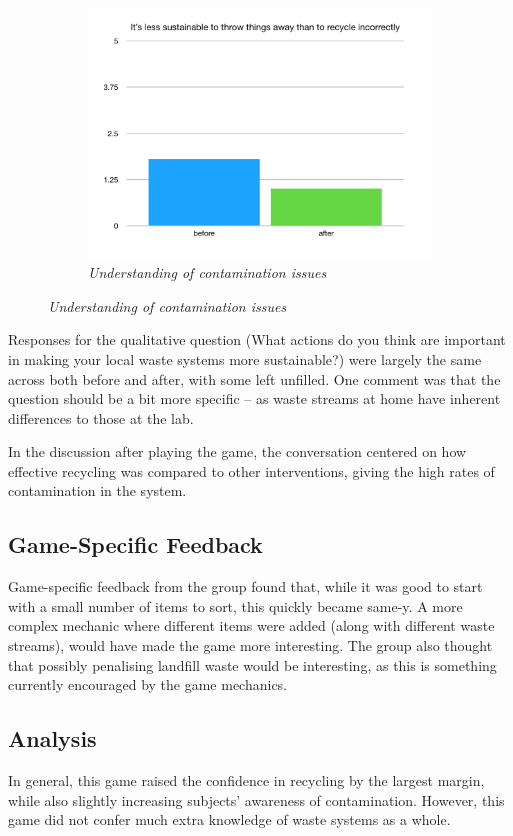 \documentclass[nofonts,nols,justified,nobib]{tufte-book}
\begin{document}
\begin{figure}
\begin{subfigure}{.45\textwidth}
  \includegraphics[width=1\linewidth]{img/4/llk-contamination.png}
\caption{\textit{Understanding of contamination issues}}
\end{subfigure}
\end{figure}
\vspace{0.8cm}

Responses for the qualitative question (What actions do you think are important in making your local waste systems more sustainable?) were largely the same across both before and after, with some left unfilled. One comment was that the question should be a bit more specific -- as waste streams at home have inherent differences to those at the lab.

In the discussion after playing the game, the conversation centered on how effective recycling was compared to other interventions, giving the high rates of contamination in the system. 

\subsection*{Game-Specific Feedback}
Game-specific feedback from the group found that, while it was good to start with a small number of items to sort, this quickly became same-y. A more complex mechanic where different items were added (along with different waste streams), would have made the game more interesting. The group also thought that possibly penalising landfill waste would be interesting, as this is something currently encouraged by the game mechanics. 

\subsection*{Analysis} 
In general, this game raised the confidence in recycling by the largest margin, while also slightly increasing subjects' awareness of contamination. However, this game did not confer much extra knowledge of waste systems as a whole.
\end{document}
